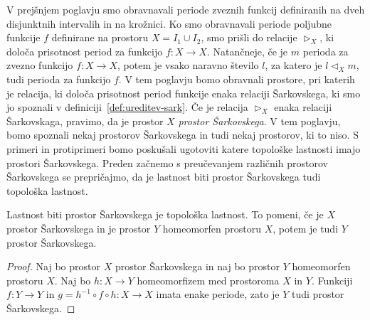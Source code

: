 \documentclass[../TG_magistrsko_delo_sections.tex]{subfiles}
\begin{document}
V prejšnjem poglavju smo obravnavali periode zveznih funkcij definiranih na dveh disjunktnih intervalih in na krožnici. Ko smo obravnavali periode poljubne funkcije $f$ definirane na prostoru $X = I_1 \cup I_2$, smo prišli do relacije $\triangleright_X$, ki določa prisotnost period za funkcijo $f : X \to X$. Natančneje, če je $m$ perioda za zvezno funkcijo $f:X \to X$, potem je vsako naravno število $l$, za katero je $l \triangleleft_X m$, tudi perioda za funkcijo $f$. V tem poglavju bomo obravnali prostore, pri katerih je relacija, ki določa prisotnost period funkcije enaka relaciji Šarkovskega, ki smo jo spoznali v definiciji~\ref{def:ureditev-sark}. Če je relacija $\triangleright_X$ enaka relaciji Šarkovskaga, pravimo, da je prostor $X$ \emph{prostor Šarkovskega}. V tem poglavju, bomo spoznali nekaj prostorov Šarkovskega in tudi nekaj prostorov, ki to niso. S primeri in protiprimeri bomo poskušali ugotoviti katere topološke lastnosti imajo prostori Šarkovskega.
Preden začnemo s preučevanjem različnih prostorov Šarkovskega se prepričajmo, da je lastnost biti prostor Šarkovskega tudi topološka lastnost. 
\begin{trditev}
Lastnost biti prostor Šarkovskega je topološka lastnost. To pomeni, če je $X$ prostor Šarkovskega in je prostor $Y$ homeomorfen prostoru $X$, potem je tudi $Y$ prostor Šarkovskega.
\end{trditev}
\begin{proof}
Naj bo prostor $X$ prostor Šarkovskega in naj bo prostor $Y$ homeomorfen prostoru $X$. Naj bo $h : X \to Y$ homeomorfizem med prostoroma $X$ in $Y$. Funkciji $f : Y \to Y$ in $g = h^{-1} \circ f \circ h : X \to X$ imata enake periode, zato je $Y$ tudi prostor Šarkovskega.
\end{proof}




\end{document}
